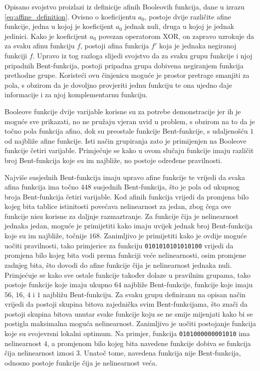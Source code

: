 Opisano svojstvo proizlazi iz definicije afinih Booleovih funkcija, dane u izrazu \eqref{eq:affine_definition}.
Ovisno o koeficijentu $a_0$, postoje dvije različite afine funkcije, jedna u kojoj je koeficijent $a_0$ jednak nuli, druga u kojoj je jednak jedinici.
Kako je koeficijent $a_0$ povezan operatorom XOR, on zapravo uzrokuje da za svaku afinu funkciju $f$, postoji afina funkcija $f'$ koja je jednaka negiranoj funkciji $f$.
Upravo iz tog razloga slijedi svojstvo da za svaku grupu funkcije i njoj pripadnih Bent-funkcija, postoji pripadna grupa dobivena negiranjem funkcija prethodne grupe.
Koristeći ovu činjenicu moguće je prostor pretrage smanjiti za pola, s obzirom da je dovoljno provjeriti jednu funkciju te ona ujedno daje informacije i za njoj komplementarnu funkciju.

Booleove funkcije dvije varijable korisne su za potrebe demonstracije jer ih je moguće sve prikazati, no ne pružaju vjeran uvid u problem, s obzirom na to da je točno pola funkcija afino, dok su preostale funkcije Bent-funkcije, s udaljenošću $1$ od najbliže afine funkcije.
Isti način grupiranja zato je primijenjen na Booleove funkcije četiri varijable.
Primjećuje se kako u ovom slučaju funkcije imaju različit broj Bent-funkcija koje su im najbliže, no postoje određene pravilnosti.

Najviše susjednih Bent-funkcija imaju upravo afine funkcije te vrijedi da svaka afina funkcija ima točno $448$ susjednih Bent-funkcija, što je pola od ukupnog broja Bent-funkcija četiri varijable.
Kod afinih funkcija vrijedi da promjena bilo kojeg bita tablice istinitosti povećava nelinearnost za jedan, zbog čega ove funkcije nisu korisne za daljnje razmaztranje.
Za funkcije čija je nelinearnost jednaka jedan, moguće je primijetiti kako imaju uvijek jednak broj Bent-funkcija koje su im najbliže, točnije $168$.
Zanimljivo je primijetiti kako je ovdije moguće uočiti pravilnosti, tako primjerice za funkciju \texttt{0101010101010100} vrijedi da promjena bilo kojeg bita vodi prema funkciji veće nelinearnosti, osim promjene zadnjeg bita, što dovodi do afine funkcije čija je nelinearnost jednaka nuli.
Primjećuje se kako sve ostale funkcije također dolaze u pravilnim grupama, tako postoje funkcije koje imaju ukupno $64$ najbliže Bent-funkcije, funkcije koje imaju $56$, $16$, $4$ i $1$ najbližu Bent-funkciju.
Za svaku grupu definiranu na opisan način vrijedi da postoji skupina bitova zajednička svim Bent-funkcijama, što znači da postoji skupina bitova unutar svake funkcije koju se ne smije mijenjati kako bi se postigla maksimalna moguća nelinearnost.
Zanimljivo je uočiti postojanje funkcija koje su svojevrsni lokalni optimum.
Na primjer, funkcija \texttt{0101000000001010} ima nelinearnost $4$, a promjenom bilo kojeg bita navedene funkcije dobiva se funkcija čija nelinearnost iznosi $3$.
Unatoč tome, navedena funkcija nije Bent-funkcija, odnosno postoje funkcije čija je nelinearnost veća.